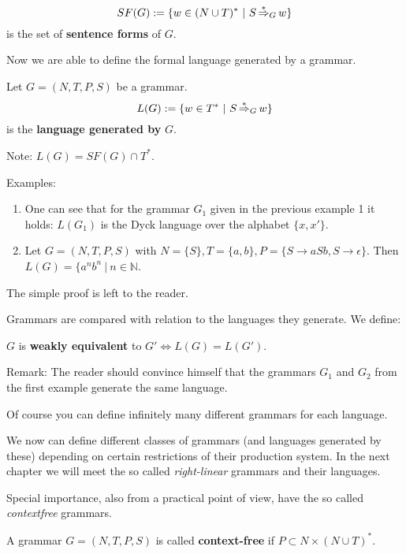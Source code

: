 \begin{definition}
\[ SF(G) := \{ w \in (N \cup T)^*\ |\ S \mbox{\,$\stackrel{*}{\Rightarrow}_{G}$\,} w \} \] is the set of {\bf
sentence forms} of $G$.
\end{definition}

Now we are able to define the formal language generated by a grammar.

\begin{definition}
Let $G = (N, T, P, S)$ be a grammar. \[ L(G) := \{ w \in T^*\ |\ S \mbox{\,$\stackrel{*}{\Rightarrow}_{G}$\,} w
\} \] is the {\bf language generated by} $G$.
\end{definition}

Note: $L(G) = SF(G) \cap T^*$.

Examples:
\begin{enumerate}
  \item One can see that for the grammar $G_1$ given in the previous example 1
  it holds: $L(G_1)$ is the Dyck language over the alphabet $\{ x, x' \}$.
  \item Let $G = (N, T, P, S)$ with $N = \{ S \}, T = \{ a, b \}, P = \{ S \to
  aSb, S \to \epsilon \}$. Then $L(G) = \{ a^n b^n \ |\ n \in \mathbb{N}$.
\end{enumerate}

The simple proof is left to the reader.

Grammars are compared with relation to the languages they generate. We define:

\begin{definition}
$G$ is {\bf weakly equivalent} to $G' \Leftrightarrow L(G) = L(G')$.
\end{definition}

Remark: The reader should convince himself that the grammars $G_1$ and $G_2$
from the first example generate the same language.

Of course you can define infinitely many different grammars for each language.

We now can define different classes of grammars (and languages generated by
these) depending on certain restrictions of their production system. In the next
chapter we will meet the so called {\em right-linear} grammars and their
languages.

Special importance, also from a practical point of view, have the so called
{\em contextfree} grammars.

\begin{definition}
A grammar $G = (N, T, P, S)$ is called {\bf context-free} if $P \subset N \times
(N \cup T)^*$.
\end{definition}

